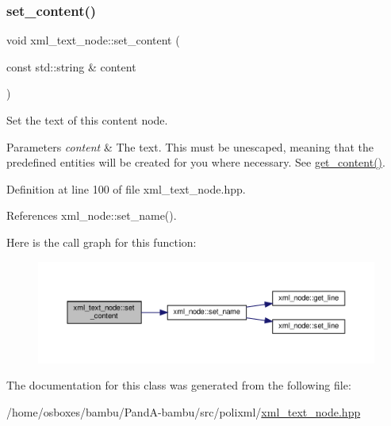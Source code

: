 \subsubsection{\texorpdfstring{set\+\_\+content()}{set\_content()}}
{\footnotesize\ttfamily void xml\+\_\+text\+\_\+node\+::set\+\_\+content (\begin{DoxyParamCaption}\item[{const std\+::string \&}]{content }\end{DoxyParamCaption})\hspace{0.3cm}{\ttfamily [inline]}}



Set the text of this content node. 


\begin{DoxyParams}{Parameters}
{\em content} & The text. This must be unescaped, meaning that the predefined entities will be created for you where necessary. See \hyperlink{classxml__text__node_afe0c3ab92ada3c4d6326c3150aefaf92}{get\+\_\+content()}. \\
\hline
\end{DoxyParams}


Definition at line 100 of file xml\+\_\+text\+\_\+node.\+hpp.



References xml\+\_\+node\+::set\+\_\+name().

Here is the call graph for this function\+:
\nopagebreak
\begin{figure}[H]
\begin{center}
\leavevmode
\includegraphics[width=350pt]{dc/de6/classxml__text__node_aa53c22b0aee2377304ebd4bae89f0cad_cgraph}
\end{center}
\end{figure}


The documentation for this class was generated from the following file\+:\begin{DoxyCompactItemize}
\item 
/home/osboxes/bambu/\+Pand\+A-\/bambu/src/polixml/\hyperlink{xml__text__node_8hpp}{xml\+\_\+text\+\_\+node.\+hpp}\end{DoxyCompactItemize}

